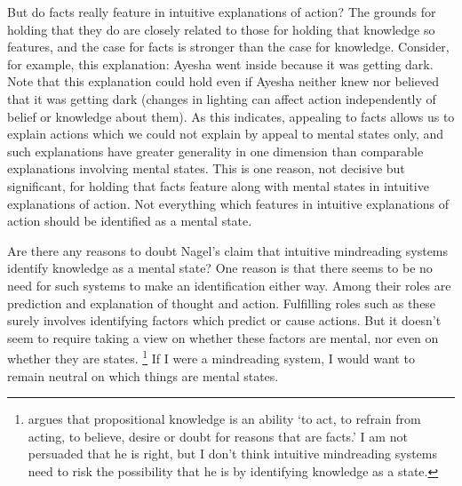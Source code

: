 \documentclass[11pt,a4paper]{extarticle}
\begin{document}
But do facts really feature in intuitive explanations of action?
The grounds for holding that they do are closely related to those for holding that knowledge so features, and the case for facts is stronger than the case for knowledge.
Consider, for example, this explanation: Ayesha went inside because it was getting dark.
Note that this explanation could hold even if Ayesha neither knew nor believed that it was getting dark (changes in lighting can affect action independently of belief or knowledge about them).
As this indicates, appealing to facts allows us to explain actions which we could not explain by appeal to mental states only, and such explanations have greater generality in one dimension than comparable explanations involving mental states.
This is one reason, not decisive but significant, for holding that facts feature along with mental states in intuitive explanations of action.
Not everything which features in intuitive explanations of action should be identified as a mental state.



Are there any reasons to doubt  Nagel's claim that intuitive mindreading systems identify knowledge as a mental state?
One reason is that there seems to be no need for such systems to make an identification either way.
Among their roles are prediction and explanation of thought and action.
Fulfilling roles such as these surely involves identifying factors which predict or cause actions. 
But it doesn't seem to require taking a view on whether these factors are mental, nor even on whether they are states.%
\footnote{
\citet[p.\ 451]{Hyman:1999fk} argues that propositional knowledge is an ability `to act, to refrain from acting, to believe, desire or doubt for reasons that are facts.' 
I am not persuaded that he is right, but I don't think intuitive mindreading systems need to risk the possibility that he is by identifying knowledge as a state.
}
If I were a mindreading system, I would want to remain neutral on which things are mental states.
\end{document}
